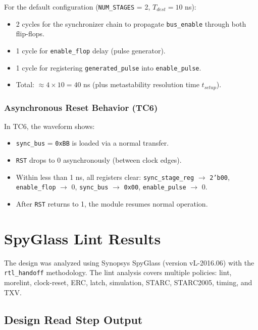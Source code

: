 \documentclass[12pt,a4paper]{article}
\begin{document}
For the default configuration (\texttt{NUM\_STAGES} = 2, $T_{dest} = 10$ ns):
\begin{itemize}
    \item 2 cycles for the synchronizer chain to propagate \texttt{bus\_enable} through both flip-flops.
    \item 1 cycle for \texttt{enable\_flop} delay (pulse generator).
    \item 1 cycle for registering \texttt{generated\_pulse} into \texttt{enable\_pulse}.
    \item Total: $\approx 4 \times 10 = 40$ ns (plus metastability resolution time $t_{setup}$).
\end{itemize}

\subsubsection{Asynchronous Reset Behavior (TC6)}

In TC6, the waveform shows:
\begin{itemize}
    \item \texttt{sync\_bus} = \texttt{0xBB} is loaded via a normal transfer.
    \item \texttt{RST} drops to 0 asynchronously (between clock edges).
    \item Within less than 1 ns, all registers clear: \texttt{sync\_stage\_reg} $\to$ \texttt{2'b00}, \texttt{enable\_flop} $\to$ 0, \texttt{sync\_bus} $\to$ \texttt{0x00}, \texttt{enable\_pulse} $\to$ 0.
    \item After \texttt{RST} returns to 1, the module resumes normal operation.
\end{itemize}

\section{SpyGlass Lint Results}

The design was analyzed using Synopsys SpyGlass (version vL-2016.06) with the \texttt{rtl\_handoff} methodology. The lint analysis covers multiple policies: lint, morelint, clock-reset, ERC, latch, simulation, STARC, STARC2005, timing, and TXV.

\subsection{Design Read Step Output}
\end{document}
